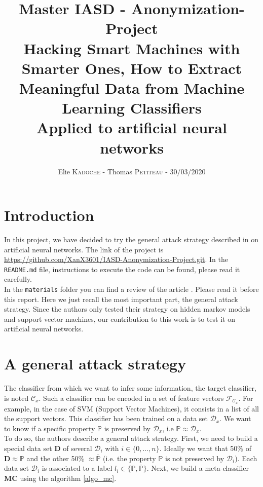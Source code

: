 \documentclass{article}
\title{
    \Large Master IASD - Anonymization-Project\\
    \LARGE Hacking Smart Machines with Smarter Ones, How to Extract Meaningful Data from Machine Learning Classifiers\\
    \Large Applied to artificial neural networks
}
\author{Elie \textsc{Kadoche} - Thomas \textsc{Petiteau} - 30/03/2020}
\date{}
\begin{document}
\maketitle

\section{Introduction}
In this project, we have decided to try the general attack strategy described in \cite{article} on artificial neural networks. The link of the project is \href{https://github.com/XanX3601/IASD-Anonymization-Project.git}{https://github.com/XanX3601/IASD-Anonymization-Project.git}. In the \verb|README.md| file, instructions to execute the code can be found, please read it carefully.\\

In the \verb|materials| folder you can find a review of the article \cite{article}. Please read it before this report. Here we just recall the most important part, the general attack strategy. Since the authors only tested their strategy on hidden markov models and support vector machines, our contribution to this work is to test it on artificial neural networks.

\section{A general attack strategy}
The classifier from which we want to infer some information, the target classifier, is noted \(\mathcal{C}_x\). Such a classifier can be encoded in a set of feature vectors \(\mathcal{F}_{\mathcal{C}_x}\). For example, in the case of SVM (Support Vector Machines), it consists in a list of all the support vectors. This classifier has been trained on a data set \(\mathcal{D}_x\). We want to know if a specific property \(\mathbb{P}\) is preserved by \(\mathcal{D}_x\), i.e \( \mathbb{P} \approx \mathcal{D}_x \).\\

To do so, the authors describe a general attack strategy. First, we need to build a  special data set \(\mathbf{D}\) of several \( \mathcal{D}_i\) with \(i \in \{0, ..., n\}\). Ideally we want that 50\% of \(\mathbf{D} \approx \mathbb{P}\) and the other 50\% \( \approx \bar{\mathbb{P}}\) (i.e. the property \(\mathbb{P}\) is not preserved by \(\mathcal{D}_i\)). Each data set \(\mathcal{D}_i\) is associated to a label \( l_i \in \{ \mathbb{P}, \bar{\mathbb{P}} \}\). Next, we build a meta-classifier \(\mathbf{MC}\) using the algorithm \ref{algo_mc}.\\
\end{document}

